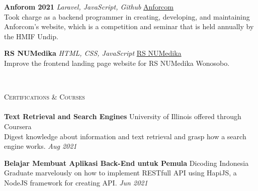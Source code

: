 \documentclass[a4paper]{article}
\newcommand{\lineunder} {
    \vspace*{-8pt} \\
    \hspace*{-18pt} \hrulefill \\
}
\newcommand{\header} [1] {
    {\hspace*{-18pt}\vspace*{6pt} \textsc{#1}}
    \vspace*{-6pt} \lineunder
}
\begin{document}
{\textbf{Anforom 2021}} {\sl Laravel, JavaScript, Github} \hfill \href{https://anforcom.com}{Anforcom}\\
Took charge as a backend programmer in creating, developing, and maintaining Anforcom's website, which is a competition and seminar that is held annually by the HMIF Undip.\\
\vspace*{2mm}



{\textbf{RS NUMedika}} {\sl HTML, CSS, JavaScript} \hfill \href{http://rsnuwonosobo.com/}{RS NUMedika}\\
Improve the frontend landing page website for RS NUMedika Wonosobo.\\
\vspace*{2mm}

\

\header{Certifications \& Courses}
\textbf{Text Retrieval and Search Engines} \hfill University of Illinois offered through Coursera\\
Digest knowledge about information and text retrieval and grasp how a search engine works. \hfill \textit{Aug 2021}\\
\vspace*{2mm}

\textbf{Belajar Membuat Aplikasi Back-End untuk Pemula} \hfill Dicoding Indonesia\\
Graduate marvelously on how to implement RESTfull API using HapiJS, a NodeJS framework for creating API. \hfill \textit{Jun 2021}\\
\vspace*{2mm}
\end{document}

